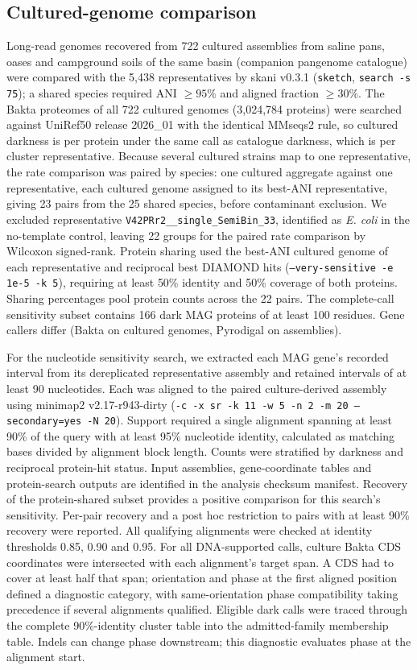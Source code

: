 \subsection*{Cultured-genome comparison}
Long-read genomes recovered from 722 cultured assemblies from saline pans, oases and campground soils of the
same basin (companion pangenome catalogue) were compared with the 5{,}438 representatives by skani
v0.3.1 \citep{shaw2023skani} (\texttt{sketch}, \texttt{search -s 75}); a shared species required ANI $\geq 95\%$ and aligned
fraction $\geq 30\%$. The Bakta proteomes of all 722 cultured genomes (3{,}024{,}784 proteins) were
searched against UniRef50 release 2026\_01 with the identical MMseqs2 rule, so cultured darkness is per protein under
the same call as catalogue darkness, which is per cluster representative. Because several cultured strains map to one representative,
the rate comparison was paired by species: one cultured aggregate against one representative, each
cultured genome assigned to its best-ANI representative, giving 23 pairs from the 25 shared species,
before contaminant exclusion. We excluded representative \texttt{V42PRr2\_\_single\_SemiBin\_33},
identified as \emph{E. coli} in the no-template control, leaving 22 groups for the paired rate
comparison by Wilcoxon signed-rank. Protein sharing used the best-ANI cultured genome of each
representative and reciprocal best DIAMOND hits (\texttt{--very-sensitive -e 1e-5 -k 5}),
requiring at least 50\% identity and 50\% coverage of both proteins. Sharing percentages pool
protein counts across the 22 pairs. The complete-call sensitivity subset contains 166 dark MAG
proteins of at least 100 residues. Gene callers differ (Bakta on cultured genomes, Pyrodigal
on assemblies).

For the nucleotide sensitivity search, we extracted each MAG gene's recorded interval from its
dereplicated representative assembly and retained intervals of at least 90 nucleotides. Each was
aligned to the paired culture-derived assembly using minimap2 v2.17-r943-dirty
(\texttt{-c -x sr -k 11 -w 5 -n 2 -m 20 --secondary=yes -N 20}). Support required a single
alignment spanning at least 90\% of the query with at least 95\% nucleotide identity, calculated
as matching bases divided by alignment block length. Counts were stratified by darkness and
reciprocal protein-hit status. Input assemblies, gene-coordinate tables and protein-search outputs
are identified in the analysis checksum manifest. Recovery of the protein-shared subset provides
a positive comparison for this search's sensitivity. Per-pair recovery and a post hoc restriction to pairs with at least
90\% recovery were reported. All qualifying alignments were checked at identity thresholds
0.85, 0.90 and 0.95. For all DNA-supported calls, culture Bakta CDS coordinates were
intersected with each alignment's target span. A CDS had to cover at least half that span;
orientation and phase at the first aligned position defined a diagnostic category, with
same-orientation phase compatibility taking precedence if several alignments qualified. Eligible dark calls were traced through the complete 90\%-identity cluster table into the admitted-family membership table. Indels
can change phase downstream; this diagnostic evaluates phase at the alignment start.

